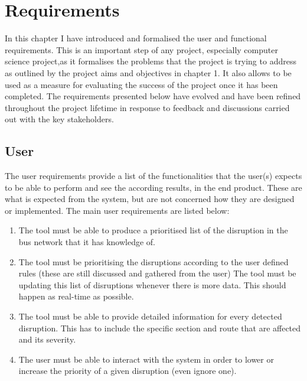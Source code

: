 \chapter{Requirements}
In this chapter I have introduced and formalised the user and functional requirements.
This is an important step of any project, especially computer science project,as it formalises the problems that the project is trying to address as outlined by the project aims and objectives in chapter 1. It also allows to be used as a measure for evaluating the success of the project once it has been completed. The requirements presented below have evolved and have been refined throughout the project lifetime in response to feedback and discussions carried out with the key stakeholders.

\section{User}
The user requirements provide a list of the functionalities that the user(s) expects to be able to perform and see the according results, in the end product. These are what is expected from the system, but are not concerned how they are designed or implemented. The main user requirements are listed below:
\begin{enumerate}
	\item The tool must be able to produce a prioritised list of the disruption in
the bus network that it has knowledge of.
	\item The tool must be prioritising the disruptions according to the user defined
rules (these are still discussed and gathered from the user)
The tool must be updating this list of disruptions whenever there is more
data. This should happen as real-time as possible.
	\item The tool must be able to provide detailed information for every detected disruption. This has to include the specific section and route that are affected and its severity.
	\item The user must be able to interact with the system in order to lower or
increase the priority of a given disruption (even ignore one).
\end{enumerate}

